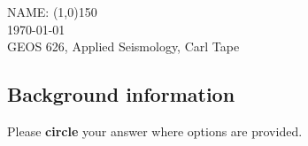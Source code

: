 \documentclass[11pt,titlepage,fleqn]{article}
\begin{document}

\noindent NAME: \line(1,0){150} \\
\noindent \today \\
\noindent GEOS 626, Applied Seismology, Carl Tape

\noindent

\subsection*{Background information}

Please {\bf circle} your answer where options are provided.
\end{document}
